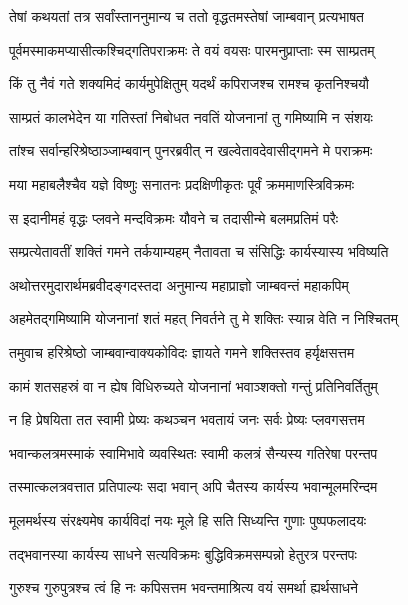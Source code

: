 \twolineshloka
{तेषां कथयतां तत्र सर्वांस्ताननुमान्य च}
{ततो वृद्धतमस्तेषां जाम्बवान् प्रत्यभाषत} %

\twolineshloka
{पूर्वमस्माकमप्यासीत्कश्चिद्गतिपराक्रमः}
{ते वयं वयसः पारमनुप्राप्ताः स्म साम्प्रतम्} %

\twolineshloka
{किं तु नैवं गते शक्यमिदं कार्यमुपेक्षितुम्}
{यदर्थं कपिराजश्च रामश्च कृतनिश्चयौ} %

\twolineshloka
{साम्प्रतं कालभेदेन या गतिस्तां निबोधत}
{नवतिं योजनानां तु गमिष्यामि न संशयः} %

\twolineshloka
{तांश्च सर्वान्हरिश्रेष्ठाञ्जाम्बवान् पुनरब्रवीत्}
{न खल्वेतावदेवासीद्गमने मे पराक्रमः} %

\twolineshloka
{मया महाबलैश्चैव यज्ञे विष्णुः सनातनः}
{प्रदक्षिणीकृतः पूर्वं क्रममाणस्त्रिविक्रमः} %

\twolineshloka
{स इदानीमहं वृद्धः प्लवने मन्दविक्रमः}
{यौवने च तदासीन्मे बलमप्रतिमं परैः} %

\twolineshloka
{सम्प्रत्येतावतीं शक्तिं गमने तर्कयाम्यहम्}
{नैतावता च संसिद्धिः कार्यस्यास्य भविष्यति} %

\twolineshloka
{अथोत्तरमुदारार्थमब्रवीदङ्गदस्तदा}
{अनुमान्य महाप्राज्ञो जाम्बवन्तं महाकपिम्} %

\twolineshloka
{अहमेतद्गमिष्यामि योजनानां शतं महत्}
{निवर्तने तु मे शक्तिः स्यान्न वेति न निश्चितम्} %

\twolineshloka
{तमुवाच हरिश्रेष्ठो जाम्बवान्वाक्यकोविदः}
{ज्ञायते गमने शक्तिस्तव हर्यृक्षसत्तम} %

\twolineshloka
{कामं शतसहस्रं वा न ह्येष विधिरुच्यते}
{योजनानां भवाञ्शक्तो गन्तुं प्रतिनिवर्तितुम्} %

\twolineshloka
{न हि प्रेषयिता तत स्वामी प्रेष्यः कथञ्चन}
{भवतायं जनः सर्वः प्रेष्यः प्लवगसत्तम} %

\twolineshloka
{भवान्कलत्रमस्माकं स्वामिभावे व्यवस्थितः}
{स्वामी कलत्रं सैन्यस्य गतिरेषा परन्तप} %

\twolineshloka
{तस्मात्कलत्रवत्तात प्रतिपाल्यः सदा भवान्}
{अपि चैतस्य कार्यस्य भवान्मूलमरिन्दम} %

\twolineshloka
{मूलमर्थस्य संरक्ष्यमेष कार्यविदां नयः}
{मूले हि सति सिध्यन्ति गुणाः पुष्पफलादयः} %

\twolineshloka
{तद्भवानस्या कार्यस्य साधने सत्यविक्रमः}
{बुद्धिविक्रमसम्पन्नो हेतुरत्र परन्तपः} %

\twolineshloka
{गुरुश्च गुरुपुत्रश्च त्वं हि नः कपिसत्तम}
{भवन्तमाश्रित्य वयं समर्था ह्यर्थसाधने} %

